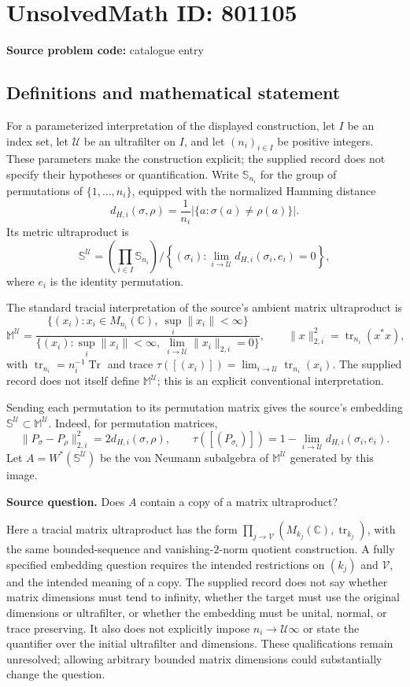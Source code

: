 \documentclass[11pt]{article}
\newcommand{\C}{\mathbb{C}}
\begin{document}
\section*{UnsolvedMath ID: 801105}
\textbf{Source problem code:} catalogue entry
\subsection{Definitions and mathematical statement}
For a parameterized interpretation of the displayed construction, let \(I\) be an index set, let \(\mathcal U\) be an ultrafilter on \(I\), and let \((n_i)_{i\in I}\) be positive integers. These parameters make the construction explicit; the supplied record does not specify their hypotheses or quantification. Write \(\mathbb S_{n_i}\) for the group of permutations of \(\{1,\ldots,n_i\}\), equipped with the normalized Hamming distance
\[
d_{H,i}(\sigma,\rho)=\frac{1}{n_i}\bigl|\{a:\sigma(a)\ne\rho(a)\}\bigr|.
\]
Its metric ultraproduct is
\[
\mathbb S^{\mathcal U}=\left(\prod_{i\in I}\mathbb S_{n_i}\right)\Big/\left\{(\sigma_i):\lim_{i\to\mathcal U}d_{H,i}(\sigma_i,e_i)=0\right\},
\]
where \(e_i\) is the identity permutation.

The standard tracial interpretation of the source's ambient matrix ultraproduct is
\[
\mathbb M^{\mathcal U}=\frac{\{(x_i):x_i\in M_{n_i}(\C),\ \sup_i\|x_i\|<\infty\}}{\{(x_i):\sup_i\|x_i\|<\infty,\ \lim_{i\to\mathcal U}\|x_i\|_{2,i}=0\}},
\qquad
\|x\|_{2,i}^{2}=\operatorname{tr}_{n_i}(x^*x),
\]
with \(\operatorname{tr}_{n_i}=n_i^{-1}\operatorname{Tr}\) and trace \(\tau([(x_i)])=\lim_{i\to\mathcal U}\operatorname{tr}_{n_i}(x_i)\). The supplied record does not itself define \(\mathbb M^{\mathcal U}\); this is an explicit conventional interpretation.

Sending each permutation to its permutation matrix gives the source's embedding \(\mathbb S^{\mathcal U}\subset\mathbb M^{\mathcal U}\). Indeed, for permutation matrices,
\[
\|P_{\sigma}-P_{\rho}\|_{2,i}^{2}=2d_{H,i}(\sigma,\rho),
\qquad
\tau([(P_{\sigma_i})])=1-\lim_{i\to\mathcal U}d_{H,i}(\sigma_i,e_i).
\]
Let \(A=W^*(\mathbb S^{\mathcal U})\) be the von Neumann subalgebra of \(\mathbb M^{\mathcal U}\) generated by this image.

\textbf{Source question.} Does \(A\) contain a copy of a matrix ultraproduct?

Here a tracial matrix ultraproduct has the form \(\prod_{j\to\mathcal V}(M_{k_j}(\C),\operatorname{tr}_{k_j})\), with the same bounded-sequence and vanishing-\(2\)-norm quotient construction. A fully specified embedding question requires the intended restrictions on \((k_j)\) and \(\mathcal V\), and the intended meaning of a copy. The supplied record does not say whether matrix dimensions must tend to infinity, whether the target must use the original dimensions or ultrafilter, or whether the embedding must be unital, normal, or trace preserving. It also does not explicitly impose \(n_i\to\mathcal U\infty\) or state the quantifier over the initial ultrafilter and dimensions. These qualifications remain unresolved; allowing arbitrary bounded matrix dimensions could substantially change the question.
\end{document}
